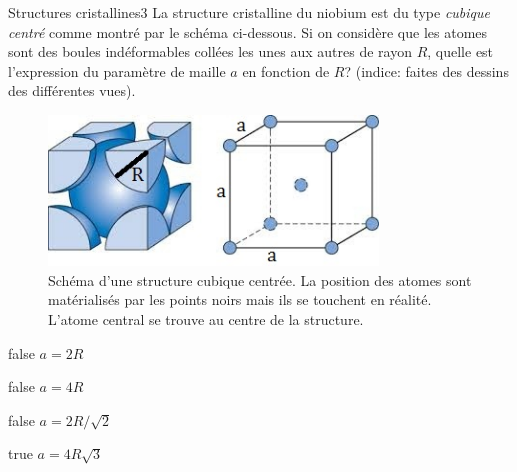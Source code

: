 \documentclass[11pt]{article}
\begin{document}
        \begin{question}{31}{Structures cristallines}{3}{}
            La structure cristalline du niobium est du type \emph{cubique centré} comme montré par le schéma ci-dessous. Si on considère que les atomes sont des boules indéformables collées les unes aux autres de rayon $R$, quelle est l'expression du paramètre de maille $a$ en fonction de $R$? (indice: faites des dessins des différentes vues).
            \begin{figure}
                \centering
                \includegraphics[height = 4cm]{Antoine/Figures_Antoine/BCC.png}
                \caption{Schéma d'une structure cubique centrée. La position des atomes sont matérialisés par les points noirs mais ils se touchent en réalité. L'atome central se trouve au centre de la structure.}
            \end{figure}
        \end{question}
        \begin{reponses} 
            \item[false] $a = 2R$
            \item[false] $a = 4R$
            \item[false] $a = 2R/\sqrt{2}$
    	    \item[true] $a = 4R\sqrt{3}$
        \end{reponses}
        
\end{document}
